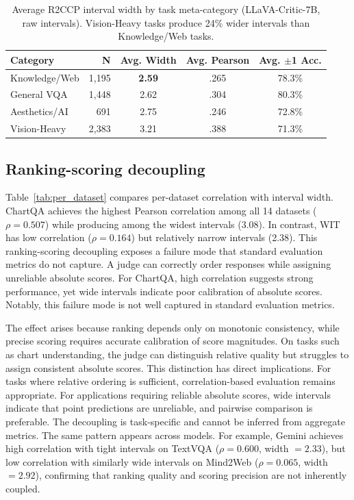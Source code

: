 \documentclass{article}
\begin{document}
\begin{table}[t]
\centering
\caption{Average R2CCP interval width by task meta-category (LLaVA-Critic-7B, raw intervals). Vision-Heavy tasks produce 24\% wider intervals than Knowledge/Web tasks.}
\label{tab:category}
\small
\begin{tabular}{lrccc}
\toprule
\textbf{Category} & \textbf{N} & \textbf{Avg. Width} & \textbf{Avg. Pearson} & \textbf{Avg. $\pm$1 Acc.} \\
\midrule
Knowledge/Web & 1,195 & \textbf{2.59} & .265 & 78.3\% \\
General VQA & 1,448 & 2.62 & .304 & 80.3\% \\
Aesthetics/AI & 691 & 2.75 & .246 & 72.8\% \\
Vision-Heavy & 2,383 & 3.21 & .388 & 71.3\% \\
\bottomrule
\end{tabular}
\end{table}


\subsection{Ranking-scoring decoupling}
\label{sec:decoupling}

Table~\ref{tab:per_dataset} compares per-dataset correlation with interval width. ChartQA achieves the highest Pearson correlation among all 14 datasets ($\rho = 0.507$) while producing among the widest intervals (3.08). In contrast, WIT has low correlation ($\rho = 0.164$) but relatively narrow intervals (2.38). This ranking-scoring decoupling exposes a failure mode that standard evaluation metrics do not capture. A judge can correctly order responses while assigning unreliable absolute scores. For ChartQA, high correlation suggests strong performance, yet wide intervals indicate poor calibration of absolute scores. Notably, this failure mode is not well captured in standard evaluation metrics.

The effect arises because ranking depends only on monotonic consistency, while precise scoring requires accurate calibration of score magnitudes. On tasks such as chart understanding, the judge can distinguish relative quality but struggles to assign consistent absolute scores. This distinction has direct implications. For tasks where relative ordering is sufficient, correlation-based evaluation remains appropriate. For applications requiring reliable absolute scores, wide intervals indicate that point predictions are unreliable, and pairwise comparison is preferable. The decoupling is task-specific and cannot be inferred from aggregate metrics. The same pattern appears across models. For example, Gemini achieves high correlation with tight intervals on TextVQA ($\rho = 0.600$, width $= 2.33$), but low correlation with similarly wide intervals on Mind2Web ($\rho = 0.065$, width $= 2.92$), confirming that ranking quality and scoring precision are not inherently coupled.
\end{document}
